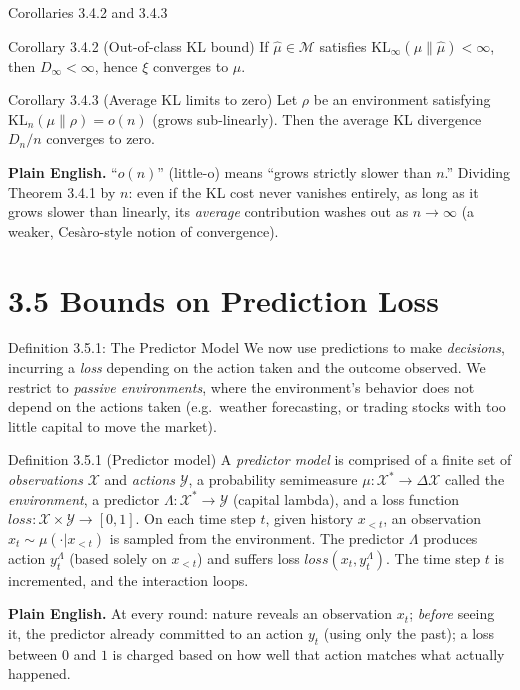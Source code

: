 \documentclass[aspectratio=169,10pt]{beamer}
\newcommand{\X}{\mathcal{X}}
\newcommand{\Mcal}{\mathcal{M}}
\newcommand{\loss}{\mathit{loss}}
\newcommand{\KL}{\mathrm{KL}}
\begin{document}
\begin{frame}{Corollaries 3.4.2 and 3.4.3}
  \begin{block}{Corollary 3.4.2 (Out-of-class KL bound)}
    If $\hat\mu \in \Mcal$ satisfies $\KL_\infty(\mu\|\hat\mu)<\infty$, then
    $D_\infty<\infty$, hence $\xi$ converges to $\mu$.
  \end{block}
  \begin{block}{Corollary 3.4.3 (Average KL limits to zero)}
    Let $\rho$ be an environment satisfying $\KL_n(\mu\|\rho)=o(n)$ (grows
    sub-linearly). Then the average KL divergence $D_n/n$ converges to zero.
  \end{block}
  \textbf{Plain English.} ``$o(n)$'' (little-o) means ``grows strictly slower
  than $n$.'' Dividing Theorem 3.4.1 by $n$: even if the KL cost never
  vanishes entirely, as long as it grows slower than linearly, its
  \emph{average} contribution washes out as $n \to \infty$ (a weaker,
  Ces\`aro-style notion of convergence).
\end{frame}

\section{3.5 Bounds on Prediction Loss}

\begin{frame}{Definition 3.5.1: The Predictor Model}
  We now use predictions to make \emph{decisions}, incurring a \emph{loss}
  depending on the action taken and the outcome observed. We restrict to
  \emph{passive environments}, where the environment's behavior does not
  depend on the actions taken (e.g.\ weather forecasting, or trading stocks
  with too little capital to move the market).
  \begin{block}{Definition 3.5.1 (Predictor model)}
    A \emph{predictor model} is comprised of a finite set of
    \emph{observations} $\X$ and \emph{actions} $\mathcal{Y}$, a probability
    semimeasure $\mu:\X^{*}\to\Delta\X$ called the \emph{environment}, a
    predictor $\Lambda:\X^{*}\to\mathcal{Y}$ (capital lambda), and a loss
    function $\loss:\X\times\mathcal{Y}\to[0,1]$. On each time step $t$,
    given history $x_{<t}$, an observation $x_t \sim \mu(\cdot|x_{<t})$ is
    sampled from the environment. The predictor $\Lambda$ produces action
    $y_t^\Lambda$ (based solely on $x_{<t}$) and suffers loss
    $\loss(x_t,y_t^\Lambda)$. The time step $t$ is incremented, and the
    interaction loops.
  \end{block}
  \textbf{Plain English.} At every round: nature reveals an observation
  $x_t$; \emph{before} seeing it, the predictor already committed to an
  action $y_t$ (using only the past); a loss between $0$ and $1$ is charged
  based on how well that action matches what actually happened.
\end{frame}
\end{document}
